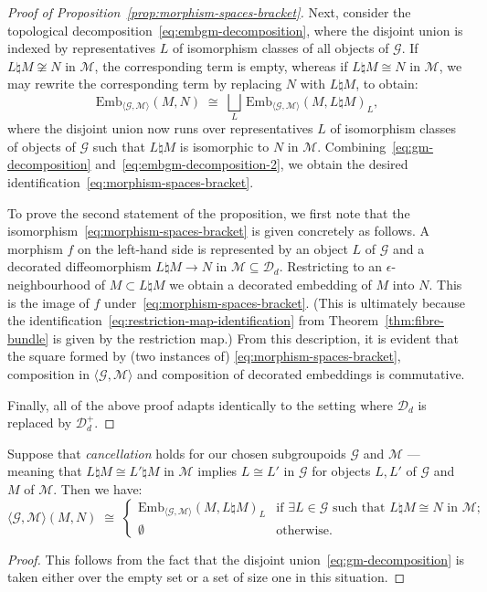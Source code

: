 \documentclass[AHL,Unicode,published]{cedram}
\newcommand{\cD}{\mathcal{D}}
\newcommand{\cG}{\mathcal{G}}
\newcommand{\cM}{\mathcal{M}}
\newcommand{\embgm}{\ensuremath{\mathrm{Emb}_{\langle \cG,\cM \rangle}}}
\let\oldexists\exists
\renewcommand*{\exists}{\mathrel{\oldexists}}
\begin{document}
\begin{proof}[Proof of Proposition~\ref{prop:morphism-spaces-bracket}]
Next, consider the topological decomposition~\eqref{eq:embgm-decomposition}, where the disjoint union is indexed by representatives $L$ of isomorphism classes of all objects of $\cG$. If $L \natural M \not\cong N$ in $\cM$, the corresponding term is empty, whereas if $L \natural M \cong N$ in $\cM$, we may rewrite the corresponding term by replacing $N$ with $L \natural M$, to obtain:
\begin{equation}\label{eq:embgm-decomposition-2}
\embgm(M,N) \;\cong\; \bigsqcup_L \, \embgm(M,L \natural M)_L,
\end{equation}
where the disjoint union now runs over representatives $L$ of isomorphism classes of objects of $\cG$ such that $L \natural M$ is isomorphic to $N$ in $\cM$. Combining~\eqref{eq:gm-decomposition} and~\eqref{eq:embgm-decomposition-2}, we obtain the desired identification~\eqref{eq:morphism-spaces-bracket}.

To prove the second statement of the proposition, we first note that the isomorphism~\eqref{eq:morphism-spaces-bracket} is given concretely as follows. A morphism $f$ on the left-hand side is represented by an object $L$ of $\cG$ and a decorated diffeomorphism $L \natural M \to N$ in $\cM \subseteq \cD_{d}$. Restricting to an $\epsilon$-neighbourhood of $M \subset L \natural M$ we obtain a decorated embedding of $M$ into $N$. This is the image of $f$ under~\eqref{eq:morphism-spaces-bracket}. (This is ultimately because the identification~\eqref{eq:restriction-map-identification} from Theorem~\ref{thm:fibre-bundle} is given by the restriction map.) From this description, it is evident that the square formed by (two instances of) \eqref{eq:morphism-spaces-bracket}, composition in $\langle \cG, \cM \rangle$ and composition of decorated embeddings is commutative.

Finally, all of the above proof adapts identically to the setting where $\cD_{d}$ is replaced by $\cD_{d}^{+}$.
\end{proof}

\begin{coro}\label{cor:cancellation1}
Suppose that \emph{cancellation} holds for our chosen subgroupoids $\cG$ and $\cM$ --- meaning that $L \natural M \cong L' \natural M$ in $\cM$ implies $L \cong L'$ in $\cG$ for objects $L,L'$ of $\cG$ and $M$ of $\cM$. Then we have:
\[
\langle \cG, \cM \rangle (M,N) \;\cong\;
\begin{cases}
\embgm(M,L\natural M)_L & \text{if } \exists L \in \cG \text{ such that } L \natural M \cong N \text{ in } \cM ; \\
\emptyset & \text{otherwise.}
\end{cases}
\]
\end{coro}
\begin{proof}
This follows from the fact that the disjoint union~\eqref{eq:gm-decomposition} is taken either over the empty set or a set of size one in this situation.
\end{proof}
\end{document}

